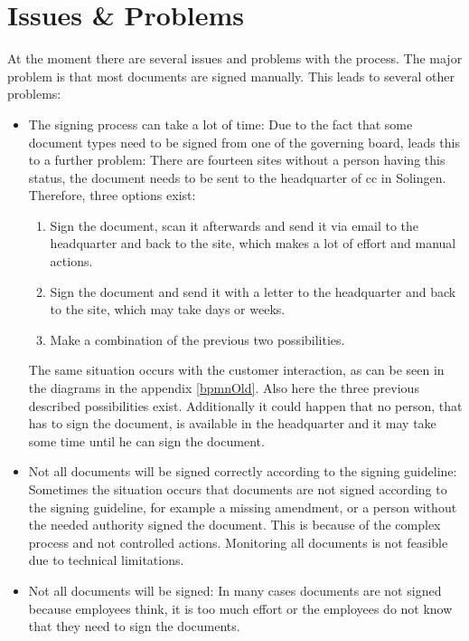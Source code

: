 \section{Issues \& Problems} \label{sec:issues}
At the moment there are several issues and problems with the process. The major problem is that most documents are signed manually. This leads to several other problems:
\begin{itemize}
	\item The signing process can take a lot of time: \newline
	Due to the fact that some document types need to be signed from one of the governing board, leads this to a further problem: There are fourteen sites without a person having this status, the document needs to be sent to the headquarter of \gls{cc} in Solingen. Therefore, three options exist:
	\begin{enumerate}
		\item Sign the document, scan it afterwards and send it via email to the headquarter and back to the site, which makes a lot of effort and manual actions.
		\item Sign the document and send it with a letter to the headquarter and back to the site, which may take days or weeks.
		\item Make a combination of the previous two possibilities.
	\end{enumerate}
	The same situation occurs with the customer interaction, as can be seen in the diagrams in the appendix \ref{bpmnOld}. Also here the three previous described possibilities exist. \newline
	Additionally it could happen that no person, that has to sign the document, is available in the headquarter and it may take some time until he can sign the document.
	\item Not all documents will be signed correctly according to the signing guideline: \newline
	Sometimes the situation occurs that documents are not signed according to the signing guideline, for example a missing amendment, or a person without the needed authority signed the document. This is because of the complex process and not controlled actions. Monitoring all documents is not feasible due to technical limitations.
	\item Not all documents will be signed:\newline
	In many cases documents are not signed because employees think, it is too much effort or the employees do not know that they need to sign the documents. 
\end{itemize} 
